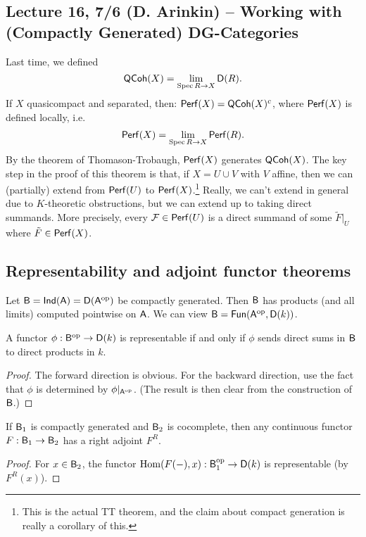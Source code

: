 \documentclass{amsart}
\begin{document}
\subsection{Lecture 16, 7/6 (D. Arinkin) -- Working with (Compactly Generated) DG-Categories}

Last time, we defined
\[
	\mathsf{QCoh}(X) = \lim_{\operatorname{Spec} R \to X} \mathsf{D}(R).
\]
If $X$ quasicompact and separated, then:
$\mathsf{Perf}(X) = \mathsf{QCoh}(X)^c$, where $\mathsf{Perf}(X)$ is defined locally, i.e.\
\[
\mathsf{Perf}(X) = \lim_{\operatorname{Spec} R \to X} \mathsf{Perf}(R).
\]
By the theorem of Thomason-Trobaugh, $\mathsf{Perf}(X)$ generates $\mathsf{QCoh}(X)$.
The key step in the proof of this theorem is that, if $X = U \cup V$ with $V$ affine, then we can (partially) extend from $\mathsf{Perf}(U)$ to $\mathsf{Perf}(X)$.\footnote{This is the actual TT theorem, and the claim about compact generation is really a corollary of this.}
Really, we can't extend in general due to $K$-theoretic obstructions, but we can extend up to taking direct summands.
More precisely, every $\mathcal{F} \in \mathsf{Perf}(U)$ is a direct summand of some $\tilde{F}|_U$ where $\tilde{F} \in \mathsf{Perf}(X)$.

\subsection{Representability and adjoint functor theorems}

Let $\mathsf{B} = \mathsf{Ind}(\mathsf{A}) = \mathsf{D}(\mathsf{A}^{\mathrm{op}})$ be compactly generated.
Then $\mathsf{B}$ has products (and all limits) computed pointwise on $\mathsf{A}$.
We can view $\mathsf{B} = \mathsf{Fun}(\mathsf{A}^{\mathrm{op}}, \mathsf{D}(k))$.

\begin{prop}
	A functor $\phi: \mathsf{B}^{\mathrm{op}} \to \mathsf{D}(k)$ is representable if and only if $\phi$ sends direct sums in $\mathsf{B}$ to direct products in $k$.
\end{prop}

\begin{proof}
	The forward direction is obvious.
	For the backward direction, use the fact that $\phi$ is determined by $\phi|_{\mathsf{A}^{\mathrm{op}}}$.
	(The result is then clear from the construction of $\mathsf{B}$.)
\end{proof}

\begin{cor}
	If $\mathsf{B}_1$ is compactly generated and $\mathsf{B}_2$ is cocomplete, then any continuous functor $F: \mathsf{B}_1 \to \mathsf{B}_2$ has a right adjoint $F^R$.
\end{cor}

\begin{proof}
	For $x \in \mathsf{B}_2$, the functor $\operatorname{Hom}(F(-), x): \mathsf{B}_1^{\mathrm{op}} \to \mathsf{D}(k)$ is representable (by $F^R(x)$).
\end{proof}
\end{document}

